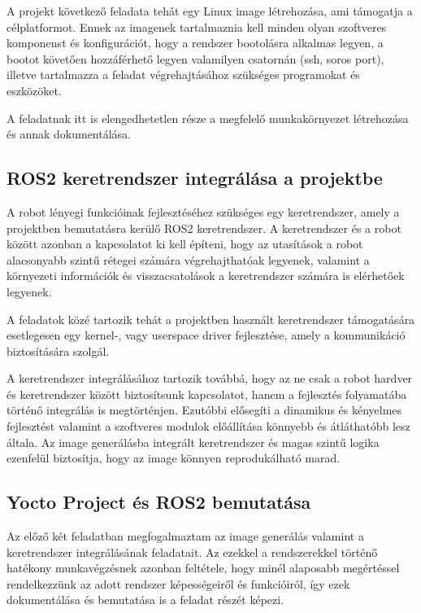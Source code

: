 A projekt következő feladata tehát egy Linux image létrehozása, ami támogatja a
célplatformot. Ennek az imagenek tartalmaznia kell minden olyan szoftveres
komponenst és konfigurációt, hogy a rendszer bootolásra alkalmas legyen, a bootot
követően hozzáférhető legyen valamilyen csatornán (ssh, soros port), illetve
tartalmazza a feladat végrehajtásához szükséges programokat és eszközöket.

A feladatnak itt is elengedhetetlen része a megfelelő munkakörnyezet létrehozása
és annak dokumentálása.

\subsection{ROS2 keretrendszer integrálása a projektbe}

A robot lényegi funkcióinak fejlesztéséhez szükséges egy keretrendszer, amely a
projektben bemutatásra kerülő ROS2 keretrendszer. A keretrendszer és a robot
között azonban a kapcsolatot ki kell építeni, hogy az utasítások a robot
alacsonyabb szintű rétegei számára végrehajthatóak legyenek, valamint a
környezeti információk és visszacsatolások a keretrendszer számára is elérhetőek
legyenek.

A feladatok közé tartozik tehát a projektben használt keretrendszer támogatására
esetlegesen egy kernel-, vagy userspace driver fejlesztése, amely a kommunikáció
biztosítására szolgál.

A keretrendszer integrálásához tartozik továbbá, hogy az ne csak a robot hardver
és keretrendszer között biztosítsunk kapcsolatot, hanem a fejlesztés folyamatába
történő integrálás is megtörténjen. Ezutóbbi elősegíti a dinamikus és kényelmes
fejlesztést valamint a szoftveres modulok előállítása könnyebb és átláthatóbb
lesz általa. Az image generálásba integrált keretrendszer és magas szintű logika
ezenfelül biztosítja, hogy az image könnyen reprodukálható marad.


\subsection{Yocto Project és ROS2 bemutatása}

Az előző két feladatban megfogalmaztam az image generálás valamint a
keretrendszer integrálásának feladatait. Az ezekkel a rendszerekkel történő
hatékony munkavégzésnek azonban feltétele, hogy minél alaposabb megértéssel
rendelkezzünk az adott rendszer képességeiről és funkcióiról, így ezek
dokumentálása és bemutatása is a feladat részét képezi.

